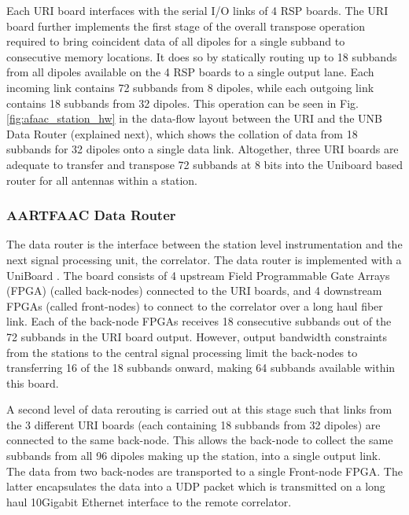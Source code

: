 \documentclass{ws-jai}
\begin{document}
Each URI board  interfaces with the serial  I/O links of 4 RSP  boards.  The URI
board  further implements  the first  stage of  the overall  transpose operation
required  to bring  coincident  data of  all  dipoles for  a  single subband  to
consecutive  memory locations.   It  does  so by  statically  routing  up to  18
subbands from all dipoles available on the 4 RSP boards to a single output lane.
Each incoming link contains 72 subbands from 8 dipoles, while each outgoing link
contains  18  subbands  from  32  dipoles.    This  operation  can  be  seen  in
Fig. \ref{fig:afaac_station_hw} in the data-flow  layout between the URI and the
UNB Data  Router (explained  next), which  shows the collation  of data  from 18
subbands for 32  dipoles onto a single data link.   Altogether, three URI boards
are adequate to  transfer and transpose 72 subbands at  8 bits into the Uniboard
based router for all antennas within a station.\\

\subsubsection {\label {sec:afaac_unb} AARTFAAC  Data Router}
The data router  is the interface between the station  level instrumentation and
the next signal processing unit, the correlator.  The data router is implemented
with a UniBoard \citep{gunst2014application}.  The  board consists of 4 upstream
Field Programmable Gate  Arrays (FPGA) (called back-nodes) connected  to the URI
boards, and 4 downstream FPGAs (called front-nodes) to connect to the correlator
over  a  long  haul  fiber  link.   Each of  the  back-node  FPGAs  receives  18
consecutive subbands out  of the 72 subbands in the  URI board output.  However,
output bandwidth constraints from the  stations to the central signal processing
limit the  back-nodes to transferring  16 of the  18 subbands onward,  making 64
subbands available within this board.

A second level  of data rerouting is  carried out at this stage  such that links
from the  3 different URI boards  (each containing 18 subbands  from 32 dipoles)
are connected to  the same back-node.  This allows the  back-node to collect the
same subbands from  all 96 dipoles making  up the station, into  a single output
link.  The data from two back-nodes are transported to a single Front-node FPGA.
The latter  encapsulates the data  into a UDP packet  which is transmitted  on a
long  haul 10Gigabit  Ethernet interface  to  the remote  correlator.  
\end{document}
